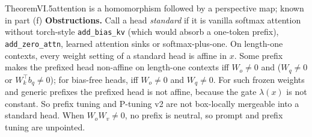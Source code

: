 \begin{restate}{Theorem}{VI.5}{attention is a homomorphism followed by a perspective map; known in part}
(f) \textbf{Obstructions.} Call a head \emph{standard} if it is vanilla softmax attention without torch-style
\texttt{add\_bias\_kv} (which would absorb a one-token prefix), \texttt{add\_zero\_attn}, learned attention sinks or
softmax-plus-one. On length-one contexts, every weight setting of a standard head is affine in $x$. Some prefix makes the
prefixed head non-affine on length-one contexts iff $W_o\ne0$ and ($W_q\ne0$ or $W_k^\top b_q\ne0$); for bias-free heads, iff
$W_o\ne0$ and $W_q\ne0$. For such frozen weights and generic prefixes the prefixed head is not affine, because the gate
$\lambda(x)$ is not constant. So prefix tuning and P-tuning v2 are not box-locally mergeable into a standard head. When
$W_oW_v\ne0$, no prefix is neutral, so prompt and prefix tuning are unpointed.
\end{restate}

